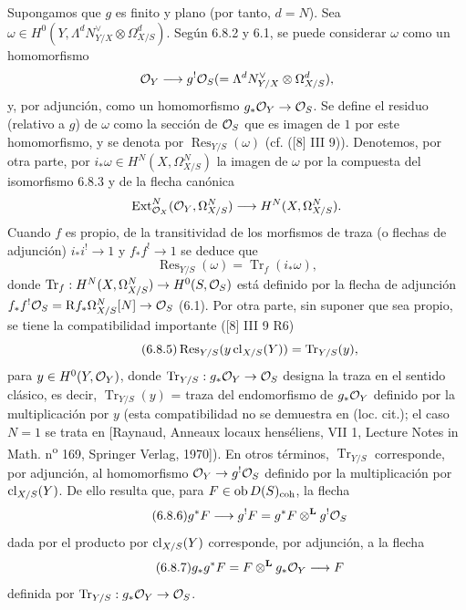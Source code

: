 Supongamos que $g$ es finito y plano (por tanto, $d=N$). Sea $\omega\in H^0(Y,\Lambda^d N_{Y/X}^{\vee}\otimes\Omega^d_{X/S})$. Según 6.8.2 y 6.1, se puede considerar $\omega$ como un homomorfismo
\[
\mathcal{O}_Y\longrightarrow g^!\mathcal{O}_S(=\Lambda^d N_{Y/X}^{\vee}\otimes\Omega^d_{X/S}),
\]
y, por adjunción, como un homomorfismo $g_*\mathcal{O}_Y\to\mathcal{O}_S$. Se define el residuo (relativo a $g$) de $\omega$ como la sección de $\mathcal{O}_S$ que es imagen de $1$ por este homomorfismo, y se denota por $\operatorname{Res}_{Y/S}(\omega)$ (cf. ([8] III 9)). Denotemos, por otra parte, por $i_*\omega\in H^N(X,\Omega^N_{X/S})$ la imagen de $\omega$ por la compuesta del isomorfismo 6.8.3 y de la flecha canónica
\[
\operatorname{Ext}^N_{\mathcal{O}_X}(\mathcal{O}_Y,\Omega^N_{X/S})\longrightarrow H^N(X,\Omega^N_{X/S}).
\]
Cuando $f$ es propio, de la transitividad de los morfismos de traza (o flechas de adjunción) $i_*i^!\to 1$ y $f_*f^!\to 1$ se deduce que
\begin{equation}
\tag{6.8.4}
\operatorname{Res}_{Y/S}(\omega)=\operatorname{Tr}_f(i_*\omega),
\end{equation}
donde $\operatorname{Tr}_f:H^N(X,\Omega^N_{X/S})\to H^0(S,\mathcal{O}_S)$ está definido por la flecha de adjunción $f_*f^!\mathcal{O}_S=\mathrm{R} f_*\Omega^N_{X/S}[N]\to\mathcal{O}_S$ (6.1). Por otra parte, sin suponer que sea propio, se tiene la compatibilidad importante ([8] III 9 R6)
\begin{equation}
\tag{6.8.5}
\operatorname{Res}_{Y/S}(y\operatorname{cl}_{X/S}(Y))=\operatorname{Tr}_{Y/S}(y),
\end{equation}
para $y\in H^0(Y,\mathcal{O}_Y)$, donde $\operatorname{Tr}_{Y/S}:g_*\mathcal{O}_Y\to\mathcal{O}_S$ designa la traza en el sentido clásico, es decir, $\operatorname{Tr}_{Y/S}(y)$ = traza del endomorfismo de $g_*\mathcal{O}_Y$ definido por la multiplicación por $y$ (esta compatibilidad no se demuestra en (loc. cit.); el caso $N=1$ se trata en [Raynaud, Anneaux locaux henséliens, VII 1, Lecture Notes in Math. n\textsuperscript{o} 169, Springer Verlag, 1970]). En otros términos, $\operatorname{Tr}_{Y/S}$ corresponde, por adjunción, al homomorfismo $\mathcal{O}_Y\to g^!\mathcal{O}_S$ definido por la multiplicación por $\operatorname{cl}_{X/S}(Y)$. De ello resulta que, para $F\in\operatorname{ob} D(S)_{\mathrm{coh}}$, la flecha
\begin{equation}
\tag{6.8.6}
g^*F\longrightarrow g^!F=g^*F\otimes^{\mathbf L}g^!\mathcal{O}_S
\end{equation}
dada por el producto por $\operatorname{cl}_{X/S}(Y)$ corresponde, por adjunción, a la flecha
\begin{equation}
\tag{6.8.7}
g_*g^*F=F\otimes^{\mathbf L}g_*\mathcal{O}_Y\longrightarrow F
\end{equation}
definida por $\operatorname{Tr}_{Y/S}:g_*\mathcal{O}_Y\to\mathcal{O}_S$.

